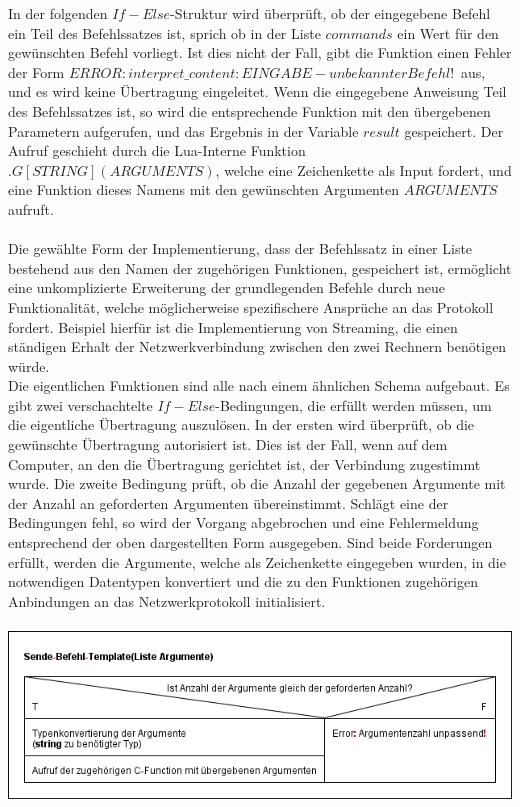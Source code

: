 In der folgenden $If-Else$-Struktur wird überprüft, ob der eingegebene Befehl ein Teil des Befehlssatzes ist, sprich ob in der Liste $commands$ ein Wert für den gewünschten Befehl vorliegt. 
Ist dies nicht der Fall, gibt die Funktion einen Fehler der Form \glqq$ERROR: interpret\_content: EINGABE - unbekannter Befehl!$\grqq\ aus, und es wird keine Übertragung eingeleitet. 
Wenn die eingegebene Anweisung Teil des Befehlssatzes ist, so wird die entsprechende Funktion mit den übergebenen Parametern aufgerufen, und das Ergebnis in der Variable $result$ gespeichert. 
Der Aufruf geschieht durch die Lua-Interne Funktion $.G[STRING](ARGUMENTS)$, welche eine Zeichenkette als Input fordert, und eine Funktion dieses Namens mit den gewünschten Argumenten $ARGUMENTS$ aufruft.\\\\
Die gewählte Form der Implementierung, dass der Befehlssatz in einer Liste bestehend aus den Namen der zugehörigen Funktionen, gespeichert ist, ermöglicht eine unkomplizierte Erweiterung der grundlegenden Befehle durch neue Funktionalität, welche möglicherweise spezifischere Ansprüche an das Protokoll fordert. 
Beispiel hierfür ist die Implementierung von Streaming, die einen ständigen Erhalt der Netzwerkverbindung zwischen den zwei Rechnern benötigen würde. \\
Die eigentlichen Funktionen sind alle nach einem ähnlichen Schema aufgebaut. 
Es gibt zwei verschachtelte $If-Else$-Bedingungen, die erfüllt werden müssen, um die eigentliche Übertragung auszulösen. 
In der ersten wird überprüft, ob die gewünschte Übertragung autorisiert ist. 
Dies ist der Fall, wenn auf dem Computer, an den die Übertragung gerichtet ist, der Verbindung zugestimmt wurde. 
Die zweite Bedingung prüft, ob die Anzahl der gegebenen Argumente mit der Anzahl an geforderten Argumenten übereinstimmt. 
Schlägt eine der Bedingungen fehl, so wird der Vorgang abgebrochen und eine Fehlermeldung entsprechend der oben dargestellten Form ausgegeben. 
Sind beide Forderungen erfüllt, werden die Argumente, welche als Zeichenkette eingegeben wurden, in die notwendigen Datentypen konvertiert und die zu den Funktionen zugehörigen Anbindungen an das Netzwerkprotokoll initialisiert.  \\\hfill\\
\includegraphics[scale=0.75]{inp}\\
